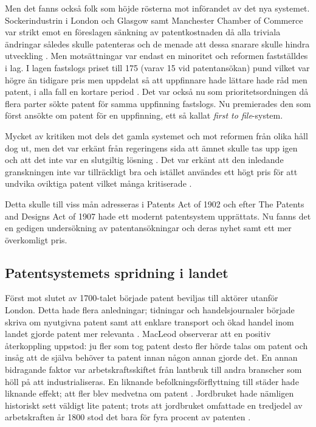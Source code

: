 Men det fanns också folk som höjde rösterna mot införandet av det nya systemet. Sockerindustrin i London och Glasgow samt Manchester Chamber of Commerce var strikt emot en föreslagen sänkning av patentkostnaden då alla triviala ändringar således skulle patenteras och de menade att dessa snarare skulle hindra utveckling \cite{dutton}. Men motsättningar var endast en minoritet och reformen fastställdes i lag. I lagen fastslogs priset till 175 (varav 15 vid patentansökan) pund vilket var högre än tidigare pris men uppdelat så att uppfinnare hade lättare hade råd men patent, i alla fall en kortare period \cite{dutton}. Det var också nu som prioritetsordningen då flera parter sökte patent för samma uppfinning fastslogs. Nu premierades den som först ansökte om patent för en uppfinning, ett så kallat \emph{first to file}-system\cite{webster}.


Mycket av kritiken mot dels det gamla systemet och mot reformen från olika håll dog ut, men det var erkänt från regeringens sida att ämnet skulle tas upp igen och att det inte var en slutgiltig lösning \cite{dutton}. Det var erkänt att den inledande granskningen inte var tillräckligt bra och istället användes ett högt pris för att undvika oviktiga patent vilket många kritiserade \cite{dutton}.

Detta skulle till viss mån adresseras i Patents Act of 1902 och efter The Patents 
and Designs Act of 1907 hade ett modernt patentsystem upprättats. Nu fanns det en gedigen undersökning av patentansökningar och deras nyhet samt ett mer överkomligt pris\cite{macleod}.







\subsection{Patentsystemets spridning i landet}

Först mot slutet av 1700-talet började patent beviljas till aktörer utanför London. Detta hade flera
anledningar; tidningar och handelsjournaler började skriva om nyutgivna patent samt att  enklare transport och
ökad handel inom landet gjorde patent mer relevanta \cite{macleod}. MacLeod observerar att en positiv återkoppling uppstod: ju fler som tog
patent desto fler hörde talas om patent och insåg att de själva behöver ta patent innan någon annan gjorde
det. En annan bidragande faktor var arbetskraftsskiftet från lantbruk till andra branscher som höll på att industrialiseras. En liknande befolkningsförflyttning till städer hade liknande effekt;
att fler blev medvetna om patent \cite{macleod}. Jordbruket hade nämligen historiskt sett väldigt lite patent; trots att
jordbruket omfattade en tredjedel av arbetskraften år 1800 stod det bara för fyra procent av patenten
\cite{macleod2}.

